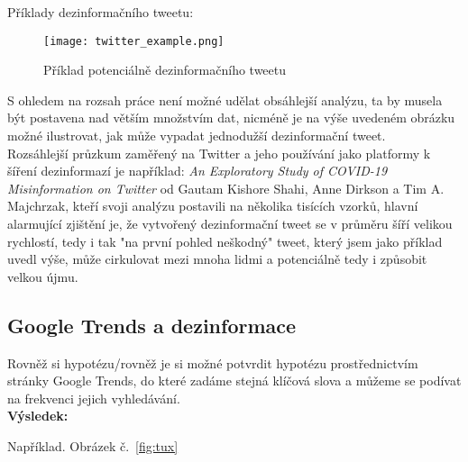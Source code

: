 Příklady dezinformačního tweetu:\\

\begin{figure}[htbp]
  \centering
  \texttt{[image: twitter\_example.png]}
  \caption{Příklad potenciálně dezinformačního tweetu}
  \label{fig:twitter example}
\end{figure}

S ohledem na rozsah práce není možné udělat obsáhlejší analýzu, ta by musela být postavena nad větším množstvím dat, nicméně je na výše uvedeném obrázku možné ilustrovat, jak může vypadat jednodužší dezinformační tweet.\\


Rozsáhlejší průzkum zaměřený na Twitter a jeho používání jako platformy k šíření dezinformazí je například: \textit{An Exploratory Study of COVID-19 Misinformation on Twitter} od Gautam Kishore Shahi, Anne Dirkson a Tim A. Majchrzak, kteří svoji analýzu postavili na několika tisících vzorků\cite{shahi_exploratory_2020}, hlavní alarmující zjištění je, že vytvořený dezinformační tweet se v průměru šíří velikou rychlostí, tedy i tak "na první pohled neškodný" tweet, který jsem jako příklad uvedl výše, může cirkulovat mezi mnoha lidmi a potenciálně tedy i způsobit velkou újmu.\\



\subsection{Google Trends a dezinformace}

Rovněž si hypotézu/rovněž je si možné potvrdit hypotézu prostřednictvím stránky Google Trends, do které zadáme stejná klíčová slova a můžeme se podívat na frekvenci jejich vyhledávání.\\

\textbf{Výsledek:}

Například. Obrázek č.~\ref{fig:tux}

